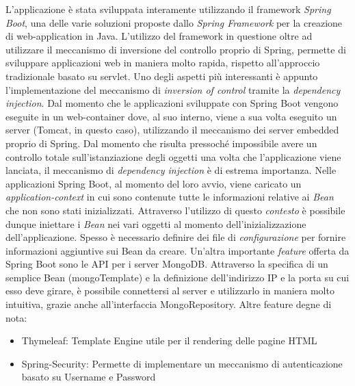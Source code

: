 L'applicazione è stata sviluppata interamente utilizzando il framework \textsl{Spring Boot}, una delle varie soluzioni proposte dallo \textsl{Spring Framework} per la creazione di web-application in Java.\newline
L'utilizzo del framework in questione oltre ad utilizzare il meccanismo di inversione del controllo proprio di Spring, permette di sviluppare applicazioni web in maniera molto rapida, rispetto all'approccio tradizionale basato su servlet.\newline\newline
Uno degli aspetti più interessanti è appunto l'implementazione del meccanismo di \textsl{inversion of control} tramite la \textsl{dependency injection}. Dal momento che le applicazioni sviluppate con Spring Boot vengono eseguite in un web-container dove, al suo interno, viene a sua volta eseguito un server (Tomcat, in questo caso), utilizzando il meccanismo dei server embedded proprio di Spring.\newline\newline
Dal momento che risulta pressoché impossibile avere un controllo totale sull'istanziazione degli oggetti una volta che l'applicazione viene lanciata, il meccanismo di \textsl{dependency injection} è di estrema importanza. Nelle applicazioni Spring Boot, al momento del loro avvio, viene caricato un \textsl{application-context} in cui sono contenute tutte le informazioni relative ai \textsl{Bean} che non sono stati inizializzati. Attraverso l'utilizzo di questo \textsl{contesto} è possibile dunque iniettare i \textsl{Bean} nei vari oggetti al momento dell'inizializzazione dell'applicazione. Spesso è necessario definire dei file di \textsl{configurazione} per fornire informazioni aggiuntive sui Bean da creare.
\newline\newline
Un'altra importante \textsl{feature} offerta da Spring Boot sono le API per i server MongoDB. Attraverso la specifica di un semplice Bean (mongoTemplate) e la definizione dell'indirizzo IP e la porta su cui esso deve girare, è possibile connettersi al server e utilizzarlo in maniera molto intuitiva, grazie anche all'interfaccia MongoRepository.\newline
Altre feature degne di nota:
\begin{itemize}
	\item Thymeleaf: Template Engine utile per il rendering delle pagine HTML
	\item Spring-Security: Permette di implementare un meccanismo di autenticazione basato su Username e Password
\end{itemize}